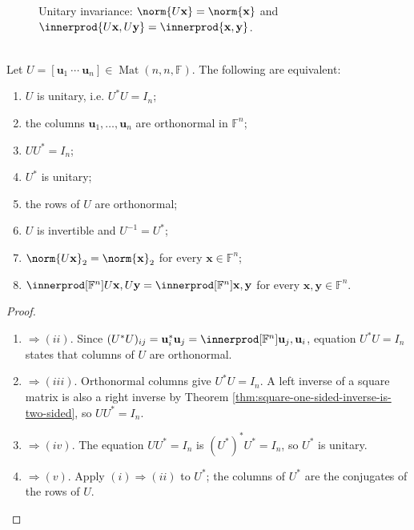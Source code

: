 \begin{figure}[H]
  \centering
  
  \caption{Unitary invariance: $\norm{U\mathbf{x}}=\norm{\mathbf{x}}$ and $\innerprod{U\mathbf{x},U\mathbf{y}}=\innerprod{\mathbf{x},\mathbf{y}}$.}
  \label{fig:unitary-isometry-geometry}
\end{figure}

\begin{theorem} \label{thm:unitary-matrix-equivalent-conditions} \\
Let $U=[\mathbf{u}_1\ \cdots\ \mathbf{u}_n]\in\operatorname{Mat}(n,n,\mathbb{F})$. The following are equivalent:
\begin{enumerate}[label=\roman*.]
\setlength{\itemsep}{0pt}
\item $U$ is unitary, i.e. $U^*U=I_n$;
\item the columns $\mathbf{u}_1,\ldots,\mathbf{u}_n$ are orthonormal in $\mathbb{F}^n$;
\item $UU^*=I_n$;
\item $U^*$ is unitary;
\item the rows of $U$ are orthonormal;
\item $U$ is invertible and $U^{-1}=U^*$;
\item $\norm{U\mathbf{x}}_2=\norm{\mathbf{x}}_2$ for every $\mathbf{x}\in\mathbb{F}^n$;
\item $\innerprod[\mathbb{F}^n]{U\mathbf{x},U\mathbf{y}}=\innerprod[\mathbb{F}^n]{\mathbf{x},\mathbf{y}}$ for every $\mathbf{x},\mathbf{y}\in\mathbb{F}^n$.
\end{enumerate}
\begin{proof}
\begin{enumerate}[label=(\roman*).]
\setlength{\itemsep}{0pt}
\item[$(i)$]$\Rightarrow (ii)$. Since $(U^*U)_{ij}=\mathbf{u}_i^*\mathbf{u}_j=\innerprod[\mathbb{F}^n]{\mathbf{u}_j,\mathbf{u}_i}$, equation $U^*U=I_n$ states that columns of $U$ are orthonormal.
\item[$(ii)$]$\Rightarrow (iii)$. Orthonormal columns give $U^*U=I_n$. A left inverse of a square matrix is also a right inverse by Theorem \ref{thm:square-one-sided-inverse-is-two-sided}, so $UU^*=I_n$.
\item[$(iii)$]$\Rightarrow (iv)$. The equation $UU^*=I_n$ is $(U^*)^*U^*=I_n$, so $U^*$ is unitary.
\item[$(iv)$]$\Rightarrow (v)$. Apply $(i)\Rightarrow(ii)$ to $U^*$; the columns of $U^*$ are the conjugates of the rows of $U$.

\end{enumerate}
\end{proof}
\end{theorem}
